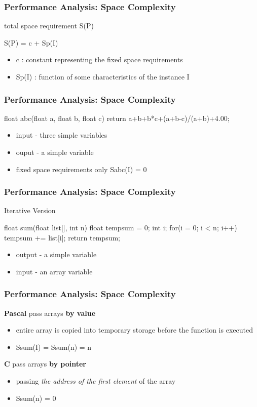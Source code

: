 \documentclass[newPxFont,sthlmFooter,nooffset]{beamer}
\begin{document}
\begin{frame}[t, fragile]
  \frametitle{Performance Analysis: Space Complexity}
total space requirement S(P)
\begin{codedef}
  S(P) = c + Sp(I)
\end{codedef}

\begin{itemize}
\item c : constant representing the fixed space requirements 
\item Sp(I) : function of some characteristics of the instance I
\end{itemize}

\end{frame}

\begin{frame}[t, fragile]
  \frametitle{Performance Analysis: Space Complexity}
\begin{codedef}
float abc(float a, float b, float c) { 
   return a+b+b*c+(a+b-c)/(a+b)+4.00;
}    
\end{codedef}
\begin{itemize}
\item input - three simple variables
\item ouput - a simple variable
\item fixed space requirements only Sabc(I) = 0
\end{itemize}

\end{frame}

\begin{frame}[t, fragile]
  \frametitle{Performance Analysis: Space Complexity}
Iterative Version
\begin{codedef}
float sum(float list[], int n) { 
   float tempsum = 0;
   int i;
   for(i = 0; i < n; i++)
      tempsum += list[i];
      return tempsum;
}
\end{codedef}
\begin{itemize}
\item output - a simple variable
\item input - an array variable
\end{itemize}
\end{frame}

\begin{frame}[t]
  \frametitle{Performance Analysis: Space Complexity}
\textbf{Pascal} pass arrays \textbf{by value}
\begin{itemize}
\item entire array is copied into temporary storage before the
  function is executed
\item Ssum(I) = Ssum(n) = n
\end{itemize}

\textbf{C} pass arrays \textbf{by pointer}
\begin{itemize}
\item passing \textit{the address of the first element} of the array
\item Ssum(n) = 0
\end{itemize}

\end{frame}
\end{document}
